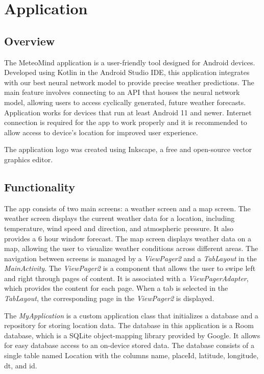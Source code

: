 \chapter{Application}

\section{Overview}
The MeteoMind application is a user-friendly tool designed for Android devices. Developed using Kotlin in the Android Studio IDE, this application integrates with our best neural network model to provide precise weather predictions. The main feature involves connecting to an API that houses the neural network model, allowing users to access cyclically generated, future weather forecasts. Application works for devices that run at least Android 11 and newer. Internet connection is required for the app to work properly and it is recommended to allow access to device's location for improved user experience. 

The application logo was created using Inkscape\cite{inkscape}, a free and open-source vector graphics editor.



\section{Functionality}

The app consists of two main screens: a weather screen and a map screen. The weather screen displays the current weather data for a location, including temperature, wind speed and direction, and atmospheric pressure. It also provides a 6 hour window forecast. The map screen displays weather data on a map, allowing the user to visualize weather conditions across different areas. The navigation between screens is managed by a \textit{ViewPager2} and a \textit{TabLayout} in the \textit{MainActivity}. The \textit{ViewPager2} is a component that allows the user to swipe left and right through pages of content. It is associated with a \textit{ViewPagerAdapter}, which provides the content for each page. When a tab is selected in the \textit{TabLayout}, the corresponding page in the \textit{ViewPager2} is displayed.

 The \textit{MyApplication} is a custom application class that initializes a database and a repository for storing location data. The database in this application is a Room database, which is a SQLite object-mapping library provided by Google. It allows for easy database access to an on-device stored data. The database consists of a single table named Location with the columns name, placeId, latitude, longitude, dt, and id.

